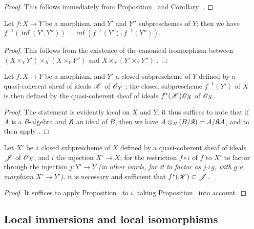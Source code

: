 \begin{proof}
\label{proof-1.4.4.3}
This follows immediately from Proposition~ and Corollary~.
\end{proof}

\begin{cor}[4.4.4]
\label{1.4.4.4}
Let $f:X\to Y$ be a morphism, and $Y'$ and $Y''$ subpreschemes of $Y$;
then we have $f^{-1}(\inf(Y',Y''))=\inf(f^{-1}(Y'),f^{-1}(Y''))$.
\end{cor}

\begin{proof}
\label{proof-1.4.4.4}
This follows from the existence of the canonical isomorphism between $(X\times_Y Y')\times_X(X\times_Y Y'')$ and $X\times_Y(Y'\times_Y Y'')$ .
\end{proof}

\begin{prop}[4.4.5]
\label{1.4.4.5}
Let $f:X\to Y$ be a morphism, and $Y'$ a closed subprescheme of $Y$ defined by a quasi-coherent sheaf of ideals $\mathscr{K}$ of $\mathscr{O}_Y$ ;
the closed subprescheme $f^{-1}(Y')$ of $X$ is then defined by the quasi-coherent sheaf of ideals $f^*(\mathscr{K})\mathscr{O}_X$ of $\mathscr{O}_X$.
\end{prop}

\begin{proof}
\label{proof-1.4.4.5}
The statement is evidently local on $X$ and $Y$;
it thus suffices to note that if $A$ is a $B$-algebra and $\mathfrak{K}$ an ideal of $B$, then we have $A\otimes_B(B/\mathfrak{K})=A/\mathfrak{K}A$, and to then apply .
\end{proof}

\begin{cor}[4.4.6]
\label{1.4.4.6}
Let $X'$ be a closed subprescheme of $X$ defined by a quasi-coherent sheaf of ideals $\mathscr{J}$ of $\mathscr{O}_X$, and $i$ the injection $X'\to X$;
for the restriction $f\circ i$ of $f$ to $X'$ to factor through the injection $j:Y'\to Y$ \emph{(in other words, for it to factor as $j\circ g$, with $g$ a morphism $X'\to Y'$)}, it is necessary and sufficient that $f^*(\mathscr{K})\subset\mathscr{J}$.
\end{cor}

\begin{proof}
\label{proof-1.4.4.6}
It suffices to apply Proposition~ to $i$, taking Proposition~ into account.
\end{proof}

\subsection{Local immersions and local isomorphisms}
\label{subsection:local-immersions-isomorphisms}

